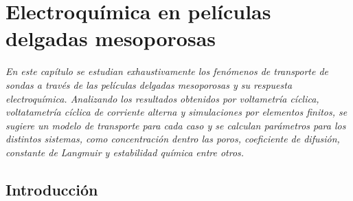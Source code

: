  \newcommand{\NoBiblioEQ}[1]{
 \ifthenelse{\equal{#1}{verdadero}}{}{}
 \NoBiblioEQ{verdadero}}


 \FormatoCapituloDosLineas
 
 \chapter{Electroquímica en películas delgadas mesoporosas}
 \label{chap:Electroquimica}

 \thispagestyle{empty}
	
 \noindent\textit{En este capítulo se estudian exhaustivamente los fenómenos de transporte de sondas a través de las películas delgadas mesoporosas y su respuesta electroquímica. Analizando los resultados obtenidos por voltametría cíclica, voltatametría cíclica de corriente alterna y simulaciones por elementos finitos, se sugiere un modelo de transporte para cada caso y se calculan parámetros para los distintos sistemas, como concentración dentro las poros, coeficiente de difusión, constante de Langmuir y estabilidad química entre otros.}

 \vfill
 \minitoc
 \newpage

\section{Introducción}

